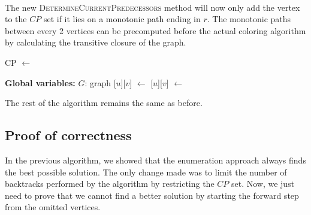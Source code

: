 \paragraph{}
The new \textsc{DetermineCurrentPredecessors} method will now only add the vertex to the $CP$ set if it lies on a monotonic path ending in $r$. The monotonic paths between every 2 vertices can be precomputed before the actual coloring algorithm by calculating the transitive closure of the graph.
\begin{alg}
	\label{alg:christofides}
 \end{alg}
 \begin{algorithmic}[1]
        \ls CP $\gets $ 
                \ls {}
            \mEndIf
        \mEndFor
	\mEndProcedure
\end{algorithmic}

 \begin{algorithmic}[1]
  \Statex \textbf{Global variables:}
 \Statex $G$: graph
            \ls {}[$u$][$v$] $\gets$ \TRUE
        \mEndFor
                            \ls  {}[$u$][$v$] $\gets$ \TRUE
                        \mEndIf
                    \mEndFor
                \mEndIf
           \mEndFor
        \mEndFor
	\mEndProcedure
\end{algorithmic}
The rest of the algorithm remains the same as before.

\subsection{Proof of correctness}
In the previous algorithm, we showed that the enumeration approach always finds the best possible solution. The only change made was to limit the number of backtracks performed by the algorithm by restricting the $CP$ set. Now, we just need to prove that we cannot find a better solution by starting the forward step from the omitted vertices.


